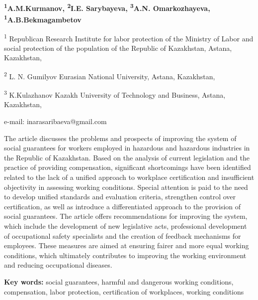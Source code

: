 \begin{center}
{\bfseries \textsuperscript{1}A.M.Kurmanov, \textsuperscript{2}I.E.
Sarybayeva\envelope, \textsuperscript{3}A.N. Omarkozhayeva,
\textsuperscript{1}A.B.Bekmagambetov}

\textsuperscript{1} Republican Research Institute for labor protection
of the Ministry of Labor and social protection of the population of the
Republic of Kazakhstan, Astana, Kazakhstan,

\textsuperscript{2} L. N. Gumilyov Eurasian National University, Astana,
Kazakhstan,

\textsuperscript{3} K.Kulazhanov Kazakh University of Technology and
Business, Astana, Kazakhstan,

e-mail: inarasaribaeva@gmail.com
\end{center}

The article discusses the problems and prospects of improving the system
of social guarantees for workers employed in hazardous and hazardous
industries in the Republic of Kazakhstan. Based on the analysis of
current legislation and the practice of providing compensation,
significant shortcomings have been identified related to the lack of a
unified approach to workplace certification and insufficient objectivity
in assessing working conditions. Special attention is paid to the need
to develop unified standards and evaluation criteria, strengthen control
over certification, as well as introduce a differentiated approach to
the provision of social guarantees. The article offers recommendations
for improving the system, which include the development of new
legislative acts, professional development of occupational safety
specialists and the creation of feedback mechanisms for employees. These
measures are aimed at ensuring fairer and more equal working conditions,
which ultimately contributes to improving the working environment and
reducing occupational diseases.

{\bfseries Key words:} social guarantees, harmful and dangerous working
conditions, compensation, labor protection, certification of workplaces,
working conditions

